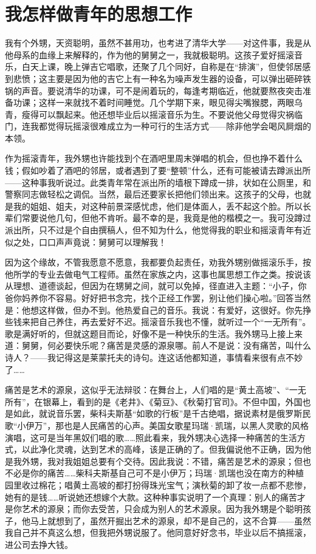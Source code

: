 \chapter{我怎样做青年的思想工作}

我有个外甥，天资聪明，虽然不甚用功，也考进了清华大学——对这件事，我是从他母系的血缘上来解释的，作为他的舅舅之一，我就极聪明。这孩子爱好摇滚音乐，白天上课，晚上弹吉它唱歌，还聚了几个同好，自称是在“排演”，但使邻居感到悲愤；这主要是因为他的吉它上有一种名为噪声发生器的设备，可以弹出砸碎铁锅的声音。要说清华的功课，可不是闹着玩的，每逢考期临近，他就要熬夜突击准备功课；这样一来就找不着时间睡觉。几个学期下来，眼见得尖嘴猴腮，两眼乌青，瘦得可以飘起来。他还想毕业后以摇滚音乐为生。不要说他父母觉得灾祸临门，连我都觉得玩摇滚很难成立为一种可行的生活方式——除非他学会喝风屙烟的本领。 

作为摇滚青年，我外甥也许能找到个在酒吧里周末弹唱的机会，但也挣不着什么钱；假如吵着了酒吧的邻居，或者遇到了要“整顿”什么，还有可能被请去蹲派出所——这种事我听说过。此类青年常在派出所的墙根下蹲成一排，状如在公厕里，和警察同志做轻松之调侃。当然，最后还要家长把他们领出来。这孩子的父母，也就是我的姐姐、姐夫，对这种前景深感忧虑，他们是体面人，丢不起这个脸。所以长辈们常要说他几句，但他不肯听。最不幸的是，我竟是他的楷模之一。我可没蹲过派出所，只不过是个自由撰稿人，但不知为什么，他觉得我的职业和摇滚青年有近似之处，口口声声竟说：舅舅可以理解我！ 

因为这个缘故，不管我愿意不愿意，我都要负起责任，劝我外甥别做摇滚乐手，按他所学的专业去做电气工程师。虽然在家族之内，这事也属思想工作之类。按说该从理想、道德谈起，但因为在甥舅之间，就可以免掉，径直进入主题：“小子，你爸你妈养你不容易。好好把书念完，找个正经工作罢，别让他们操心啦。”回答当然是：他想这样做，但办不到。他热爱自己的音乐。我说：有爱好，这很好。你先挣些钱来把自己养住，再去爱好不迟。摇滚音乐我也不懂，就听过一个“一无所有”。歌是满好听的，但就这题目而论，好像不是一种快乐的生活。我外甥马上接上来道：舅舅，何必要快乐呢？痛苦是灵感的源泉哪。前人不是说：没有痛苦，叫什么诗人？——我记得这是莱蒙托夫的诗句。连这话他都知道，事情看来很有点不妙了…… 

痛苦是艺术的源泉，这似乎无法辩驳：在舞台上，人们唱的是“黄土高坡”、“一无所有”，在银幕上，看到的是《老井》、《菊豆》、《秋菊打官司》。不但中国，外国也是如此，就说音乐罢，柴科夫斯基“如歌的行板”是千古绝唱，据说素材是俄罗斯民歌“小伊万”，那也是人民痛苦的心声。美国女歌星玛瑞·凯瑞，以黑人灵歌的风格演唱，这可是当年黑奴们唱的歌……照此看来，我外甥决心选择一种痛苦的生活方式，以此净化灵魂，达到艺术的高峰，该是正确的了。但我偏说他不正确，因为他是我外甥，我对我姐姐总要有个交待。因此我说：不错，痛苦是艺术的源泉；但也不必是你的痛苦……柴科夫斯基自己可不是小伊万；玛瑞·凯瑞也没在南方的种植园里收过棉花；唱黄土高坡的都打扮得珠光宝气；演秋菊的卸了妆一点都不悲惨，她有的是钱……听说她还想嫁个大款。这种种事实说明了一个真理：别人的痛苦才是你艺术的源泉；而你去受苦，只会成为别人的艺术源泉。因为我外甥是个聪明孩子，他马上就想到了，虽然开掘出艺术的源泉，却不是自己的，这不合算——虽然我自己并不真这么想，但我把外甥说服了。他同意好好念书，毕业以后不搞摇滚，进公司去挣大钱。 

